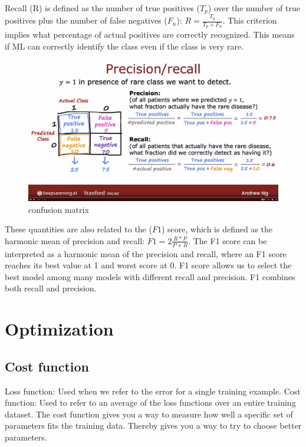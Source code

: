 \documentclass[12pt]{report}
\begin{document}
Recall (R) is defined as the number of true positives ($T_p$) over the number of true positives plus the number of false negatives ($F_n$): $R = \frac{T_p}{T_p + F_n} $. This criterion implies what percentage of actual positives are correctly recognized. This means if ML can correctly identify the class even if the class is very rare.


\begin{figure}[H]
  \centering
  \includegraphics[trim =0.0cm 0.0cm 0.0cm 0.0cm, clip, scale=0.15]{pics/confusionMatrix.png}
  \caption{confusion matrix}
\end{figure}


These quantities are also related to the ($F1$) score, which is defined as the harmonic mean of precision and recall: $F1 = 2 \frac{R * P}{ P + R } $. The F1 score can be interpreted as a harmonic mean of the precision and recall, where an F1 score reaches its best value at 1 and worst score at 0. F1 score allows us to select the best model among many models with different recall and precision. F1 combines both recall and precision.

\section{Optimization}

\subsection{Cost function}
\label{sec:cost}
Loss function: Used when we refer to the error for a single training example. Cost function: Used to refer to an average of the loss functions over an entire training dataset.
The cost function gives you a way to measure how well a specific set of parameters fits the training data. Thereby gives you a way to try to choose better parameters.
\end{document}
